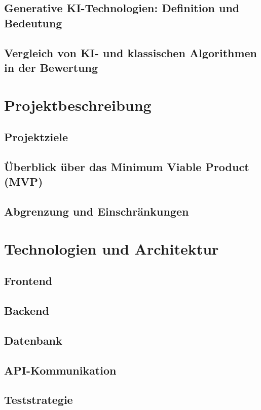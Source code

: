 \documentclass[a4paper,12pt]{article}
\begin{document}
\subsection{Generative KI-Technologien: Definition und Bedeutung}
\subsection{Vergleich von KI- und klassischen Algorithmen in der Bewertung}

\newpage

\section{Projektbeschreibung}
\subsection{Projektziele}
\subsection{Überblick über das Minimum Viable Product (MVP)}
\subsection{Abgrenzung und Einschränkungen}

\newpage


\section{Technologien und Architektur}
\subsection{Frontend}
\subsection{Backend}
\subsection{Datenbank}
\subsection{API-Kommunikation}
\subsection{Teststrategie}
\end{document}
